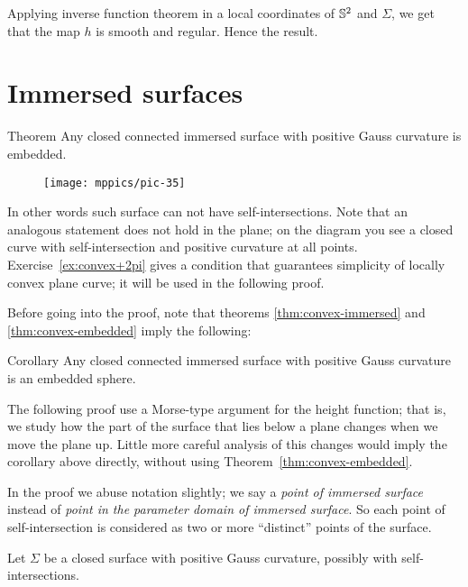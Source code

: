 Applying inverse function theorem in a local coordinates of $\mathbb{S}^2$ and $\Sigma$,
we get that the map $h$ is smooth and regular.
Hence the result.
\qeds

\section{Immersed surfaces}

\begin{thm}{Theorem}\label{thm:convex-immersed}
Any closed connected immersed surface with positive Gauss curvature is embedded.
\end{thm}



\begin{wrapfigure}{r}{20 mm}
\vskip-0mm
\centering
\texttt{[image: mppics/pic-35]}
\vskip-0mm
\end{wrapfigure}

In other words such surface can not have self-intersections.
Note that an analogous statement does not hold in the plane;
on the diagram you see a closed curve with self-intersection and positive curvature at all points.
Exercise~\ref{ex:convex+2pi} gives a condition that guarantees simplicity of locally convex plane curve;
it will be used in the following proof.



Before going into the proof, note that theorems \ref{thm:convex-immersed} and \ref{thm:convex-embedded}
imply the following:

\begin{thm}{Corollary}
Any closed connected immersed surface with positive Gauss curvature is an embedded sphere.
\end{thm}

The following proof use a Morse-type argument for the height function;
that is, we study how the part of the surface that lies below a plane changes when we move the plane up.
Little more careful analysis of this changes would imply the corollary above directly, without using Theorem~\ref{thm:convex-embedded}.

In the proof we abuse notation slightly;
we say a \emph{point of immersed surface} instead of \emph{point in the parameter domain of immersed surface}.
So each point of self-intersection is considered as two or more ``distinct'' points of the surface.

Let $\Sigma$ be a closed surface with positive Gauss curvature, possibly with self-intersections. 

